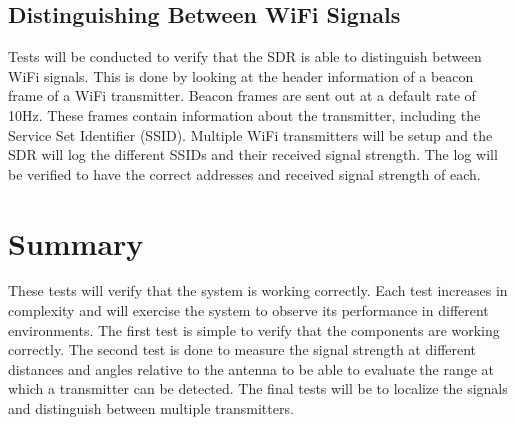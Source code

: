\subsection{Distinguishing Between WiFi Signals}
Tests will be conducted to verify that the SDR is able to distinguish between WiFi signals. This is done by looking at the header information of a beacon frame of a WiFi transmitter. Beacon frames are sent out at a default rate of 10Hz. These frames contain information about the transmitter, including the Service Set Identifier (SSID). Multiple WiFi transmitters will be setup and the SDR will log the different SSIDs and their received signal strength. The log will be verified to have the correct addresses and received signal strength of each. 

\section{Summary}
These tests will verify that the system is working correctly. Each test increases in complexity and will exercise the system to observe its performance in different environments. The first test is simple to verify that the components are working correctly. The second test is done to measure the signal strength at different distances and angles relative to the antenna to be able to evaluate the range at which a transmitter can be detected. The final tests will be to localize the signals and distinguish between multiple transmitters.
